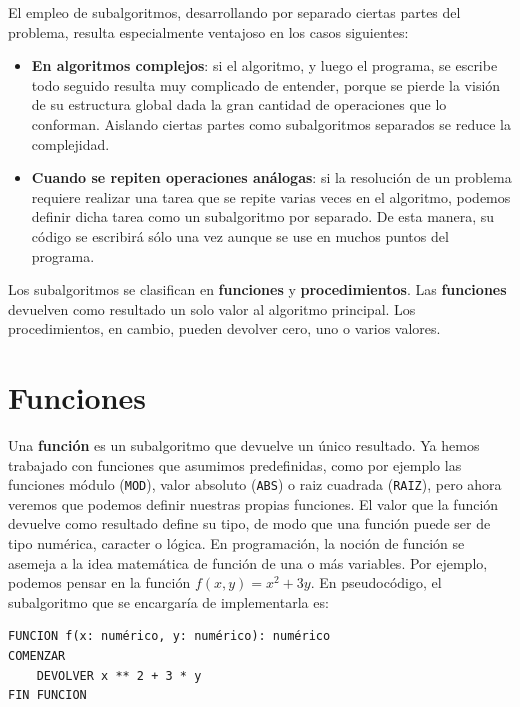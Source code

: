 \documentclass[]{book}
\providecommand{\tightlist}{%
  \setlength{\itemsep}{0pt}\setlength{\parskip}{0pt}}
\begin{document}
El empleo de subalgoritmos, desarrollando por separado ciertas partes
del problema, resulta especialmente ventajoso en los casos siguientes:

\begin{itemize}
\tightlist
\item
  \textbf{En algoritmos complejos}: si el algoritmo, y luego el
  programa, se escribe todo seguido resulta muy complicado de entender,
  porque se pierde la visión de su estructura global dada la gran
  cantidad de operaciones que lo conforman. Aislando ciertas partes como
  subalgoritmos separados se reduce la complejidad.
\item
  \textbf{Cuando se repiten operaciones análogas}: si la resolución de
  un problema requiere realizar una tarea que se repite varias veces en
  el algoritmo, podemos definir dicha tarea como un subalgoritmo por
  separado. De esta manera, su código se escribirá sólo una vez aunque
  se use en muchos puntos del programa.
\end{itemize}

Los subalgoritmos se clasifican en \textbf{funciones} y
\textbf{procedimientos}. Las \textbf{funciones} devuelven como resultado
un solo valor al algoritmo principal. Los procedimientos, en cambio,
pueden devolver cero, uno o varios valores.

\section{Funciones}\label{funciones}

Una \textbf{función} es un subalgoritmo que devuelve un único resultado.
Ya hemos trabajado con funciones que asumimos predefinidas, como por
ejemplo las funciones módulo (\texttt{MOD}), valor absoluto
(\texttt{ABS}) o raiz cuadrada (\texttt{RAIZ}), pero ahora veremos que
podemos definir nuestras propias funciones. El valor que la función
devuelve como resultado define su tipo, de modo que una función puede
ser de tipo numérica, caracter o lógica. En programación, la noción de
función se asemeja a la idea matemática de función de una o más
variables. Por ejemplo, podemos pensar en la función
\(f(x, y) = x^2 + 3y\). En pseudocódigo, el subalgoritmo que se
encargaría de implementarla es:

\begin{verbatim}
FUNCION f(x: numérico, y: numérico): numérico
COMENZAR
    DEVOLVER x ** 2 + 3 * y
FIN FUNCION
\end{verbatim}
\end{document}
